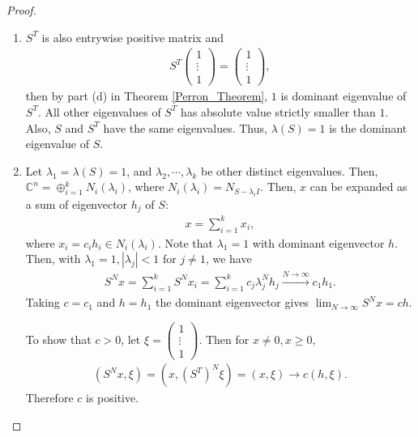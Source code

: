 \documentclass[11pt]{book}
\theoremstyle{definition}
\numberwithin{equation}{chapter}
\begin{document}
\begin{proof}
~\begin{enumerate}[label=(\alph*)]
    \item $S^T$ is also entrywise positive matrix and 
    \begin{align*}
        S^T \begin{pmatrix} 1 \\ \vdots \\ 1 \end{pmatrix} = \begin{pmatrix} 1 \\ \vdots \\ 1 \end{pmatrix},
    \end{align*}
    then by part (d) in Theorem \ref{Perron_Theorem}, $1$ is dominant eigenvalue of $S^T$. All other eigenvalues of $S^T$ has absolute value strictly smaller than $1$. Also, $S$ and $S^T$ have the same eigenvalues. Thus, $\lambda(S) = 1$ is the dominant eigenvalue of $S$.
    
    \item Let $\lambda_1 = \lambda(S) = 1$, and $\lambda_2, \cdots, \lambda_k$ be other distinct eigenvalues. Then, $\mathbb{C}^n = \oplus^k_{i=1} N_i(\lambda_i)$, where $N_i(\lambda_i) = N_{S - \lambda_i I}$. Then, $x$ can be expanded as a sum of eigenvector $h_j$ of $S$:
    \begin{align*}
        x = \sum^k_{i=1} x_i,
    \end{align*}
    where $x_i = c_i h_i \in N_i(\lambda_i)$. Note that $\lambda_1 = 1$ with dominant eigenvector $h$. Then, with $\lambda_1 = 1, |\lambda_j| < 1$ for $j \neq 1$, we have
    \begin{align*}
        S^N x = \sum^k_{i=1} S^N x_i = \sum^k_{i=1} c_j \lambda_j^N h_j \xrightarrow[]{N\to\infty} c_1 h_1.
    \end{align*}
    Taking $c = c_1$ and $h = h_1$ the dominant eigenvector gives $\lim_{N \to \infty} S^N x = ch$.
    
    To show that $c > 0$, let $\xi = \begin{pmatrix} 1 \\ \vdots \\ 1 \end{pmatrix}$. Then for $x \neq 0, x \geq 0$, 
    \begin{align*}
        \left(S^Nx, \xi\right) = \left(x, \left(S^T\right)^N \xi\right) = (x, \xi) \to c(h, \xi).
    \end{align*}
    Therefore $c$ is positive. 
\end{enumerate}
\end{proof}
\end{document}
